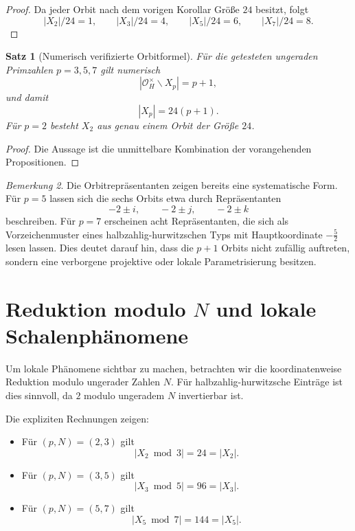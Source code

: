 \documentclass[12pt,a4paper]{article}
\theoremstyle{plain}
\newtheorem{satz}{Satz}[section]
\theoremstyle{definition}
\theoremstyle{remark}
\newtheorem{bemerkung}[satz]{Bemerkung}
\newcommand{\OH}{\mathcal O_H}
\begin{document}
	\begin{proof}
		Da jeder Orbit nach dem vorigen Korollar Größe \(24\) besitzt, folgt
		\[
		|X_2|/24=1,\qquad |X_3|/24=4,\qquad |X_5|/24=6,\qquad |X_7|/24=8.
		\]
	\end{proof}
	
	\begin{satz}[Numerisch verifizierte Orbitformel]
		Für die getesteten ungeraden Primzahlen \(p=3,5,7\) gilt numerisch
		\[
		|\OH^\times\backslash X_p|=p+1,
		\]
		und damit
		\[
		|X_p|=24(p+1).
		\]
		Für \(p=2\) besteht \(X_2\) aus genau einem Orbit der Größe \(24\).
	\end{satz}
	
	\begin{proof}
		Die Aussage ist die unmittelbare Kombination der vorangehenden Propositionen.
	\end{proof}
	
	\begin{bemerkung}
		Die Orbitrepräsentanten zeigen bereits eine systematische Form. Für \(p=5\) lassen sich die
		sechs Orbits etwa durch Repräsentanten
		\[
		-2\pm i,\qquad -2\pm j,\qquad -2\pm k
		\]
		beschreiben. Für \(p=7\) erscheinen acht Repräsentanten, die sich als Vorzeichenmuster
		eines halbzahlig-hurwitzschen Typs mit Hauptkoordinate \(-\frac52\) lesen lassen.
		Dies deutet darauf hin, dass die \(p+1\) Orbits nicht zufällig auftreten, sondern eine
		verborgene projektive oder lokale Parametrisierung besitzen.
	\end{bemerkung}
	
	\section{Reduktion modulo \texorpdfstring{$N$}{N} und lokale Schalenphänomene}
	
	Um lokale Phänomene sichtbar zu machen, betrachten wir die koordinatenweise Reduktion modulo
	ungerader Zahlen \(N\). Für halbzahlig-hurwitzsche Einträge ist dies sinnvoll, da \(2\) modulo
	ungeradem \(N\) invertierbar ist.
	
	Die expliziten Rechnungen zeigen:
	
	\begin{itemize}
		\item Für \((p,N)=(2,3)\) gilt
		\[
		|X_2 \bmod 3|=24=|X_2|.
		\]
		\item Für \((p,N)=(3,5)\) gilt
		\[
		|X_3 \bmod 5|=96=|X_3|.
		\]
		\item Für \((p,N)=(5,7)\) gilt
		\[
		|X_5 \bmod 7|=144=|X_5|.
		\]
	\end{itemize}
	
\end{document}
